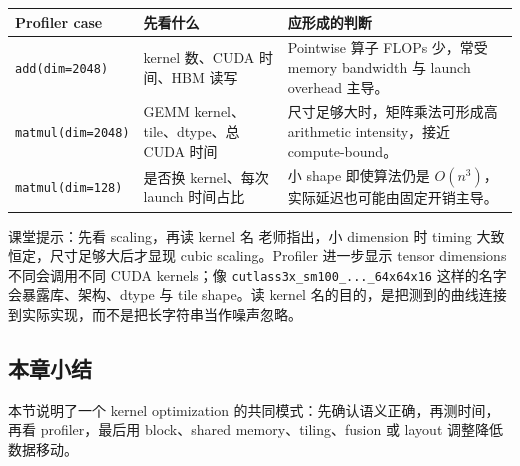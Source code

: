 \begin{longtable}{p{}p{}p{}}
\toprule
\textbf{Profiler case} & \textbf{先看什么} & \textbf{应形成的判断} \\
\midrule
\texttt{add(dim=2048)} & kernel 数、CUDA 时间、HBM 读写 & Pointwise 算子 FLOPs 少，常受 memory bandwidth 与 launch overhead 主导。 \\
\texttt{matmul(dim=2048)} & GEMM kernel、tile、dtype、总 CUDA 时间 & 尺寸足够大时，矩阵乘法可形成高 arithmetic intensity，接近 compute-bound。 \\
\texttt{matmul(dim=128)} & 是否换 kernel、每次 launch 时间占比 & 小 shape 即使算法仍是 \(O(n^3)\)，实际延迟也可能由固定开销主导。 \\
\bottomrule
\end{longtable}

\begin{knowledgebox}{课堂提示：先看 scaling，再读 kernel 名}
老师指出，小 dimension 时 timing 大致恒定，尺寸足够大后才显现 cubic scaling。Profiler 进一步显示 tensor dimensions 不同会调用不同 CUDA kernels；像 \texttt{cutlass3x\_sm100\_...\_64x64x16} 这样的名字会暴露库、架构、dtype 与 tile shape。读 kernel 名的目的，是把测到的曲线连接到实际实现，而不是把长字符串当作噪声忽略。
\end{knowledgebox}
\subsection{本章小结}
本节说明了一个 kernel optimization 的共同模式：先确认语义正确，再测时间，再看 profiler，最后用 block、shared memory、tiling、fusion 或 layout 调整降低数据移动。

